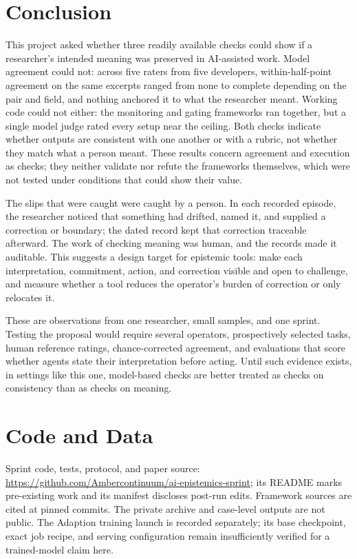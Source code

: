\documentclass[11pt]{article}
\begin{document}
\section{Conclusion}
This project asked whether three readily available checks could show if a researcher's intended meaning was preserved in AI-assisted work. Model agreement could not: across five raters from five developers, within-half-point agreement on the same excerpts ranged from none to complete depending on the pair and field, and nothing anchored it to what the researcher meant. Working code could not either: the monitoring and gating frameworks ran together, but a single model judge rated every setup near the ceiling. Both checks indicate whether outputs are consistent with one another or with a rubric, not whether they match what a person meant. These results concern agreement and execution as checks; they neither validate nor refute the frameworks themselves, which were not tested under conditions that could show their value.

The slips that were caught were caught by a person. In each recorded episode, the researcher noticed that something had drifted, named it, and supplied a correction or boundary; the dated record kept that correction traceable afterward. The work of checking meaning was human, and the records made it auditable. This suggests a design target for epistemic tools: make each interpretation, commitment, action, and correction visible and open to challenge, and measure whether a tool reduces the operator's burden of correction or only relocates it.

These are observations from one researcher, small samples, and one sprint. Testing the proposal would require several operators, prospectively selected tasks, human reference ratings, chance-corrected agreement, and evaluations that score whether agents state their interpretation before acting. Until such evidence exists, in settings like this one, model-based checks are better treated as checks on consistency than as checks on meaning.
\section*{Code and Data}
Sprint code, tests, protocol, and paper source: \url{https://github.com/Ambercontinuum/ai-epistemics-sprint}; its README marks pre-existing work and its manifest discloses post-run edits. Framework sources are cited at pinned commits. The private archive and case-level outputs are not public. The Adaption training launch is recorded separately; its base checkpoint, exact job recipe, and serving configuration remain insufficiently verified for a trained-model claim here.
\end{document}

